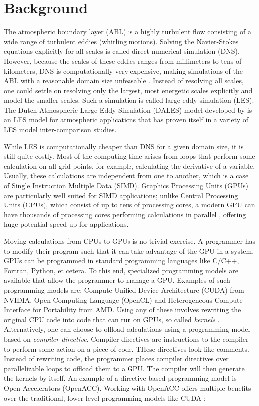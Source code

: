 \section{Background}
The atmospheric boundary layer (ABL) is a highly turbulent flow consisting of a wide range of turbulent eddies (whirling motions). Solving the Navier-Stokes equations explicitly for all scales is called direct numerical simulation (DNS). However, because the scales of these eddies ranges from millimeters to tens of kilometers, DNS is computationally very expensive, making simulations of the ABL with a reasonable domain size unfeasable \citep{moengNUMERICALMODELSLargeEddy2015}. Instead of resolving all scales, one could settle on resolving only the largest, most energetic scales explicitly and model the smaller scales. Such a simulation is called large-eddy simulation (LES). The Dutch Atmospheric Large-Eddy Simulation (DALES) model developed by \citet{heusFormulationDutchAtmospheric2010} is an LES model for atmospheric applications that has proven itself in a variety of LES model inter-comparison studies.

While LES is computationally cheaper than DNS for a given domain size, it is still quite costly. Most of the computing time arises from loops that perform some calculation on all grid points, for example, calculating the derivative of a variable. Usually, these calculations are independent from one to another, which is a case of Single Instruction Multiple Data (SIMD). Graphics Processing Units (GPUs) are particularly well suited for SIMD applications; unlike Central Processing Units (CPUs), which consist of up to tens of processing cores, a modern GPU can have thousands of processing cores performing calculations in parallel \citep{elsterNvidiaHopperGPU2022}, offering huge potential speed up for applications. 

Moving calculations from CPUs to GPUs is no trivial exercise. A programmer has to modify their program such that it can take advantage of the GPU in a system. GPUs can be programmed in standard programming languages like C/C++, Fortran, Python, et cetera. To this end, specialized programming models are available that allow the programmer to manage a GPU. Examples of such programming models are: Compute Unified Device Architecture (CUDA) from NVIDIA, Open Computing Language (OpenCL) and Heterogeneous-Compute Interface for Portability from AMD. Using any of these involves rewriting the original CPU code into code that can run on GPUs, so called \emph{kernels} \citep{owensGPUComputing2008}. 
Alternatively, one can choose to offload calculations using a programming model based on \emph{compiler directive}. Compiler directives are instructions to the compiler to perform some action on a piece of code. THese directives look like comments. Instead of rewriting code, the programmer places compiler directives over parallelizable loops to offload them to a GPU. The compiler will then generate the kernels by itself. An example of a directive-based programming model is Open Accelerators (OpenACC). Working with OpenACC offers multiple benefits over the traditional, lower-level programming models like CUDA \citep{herdmanAcceleratingHydrocodesOpenACC2012}:

